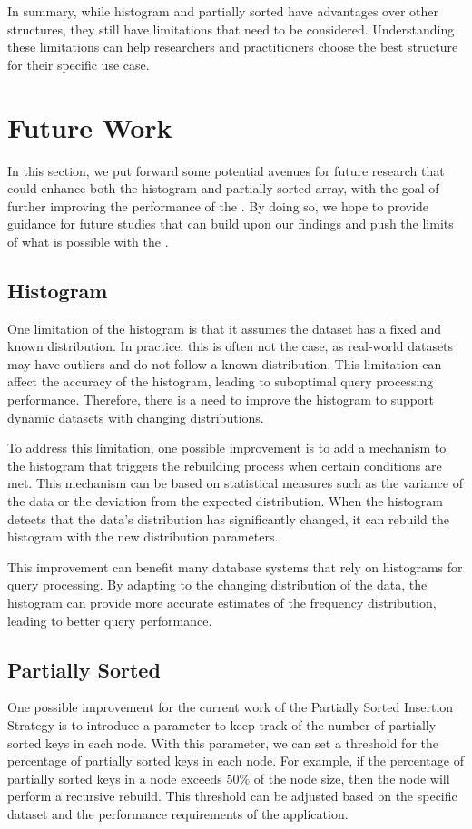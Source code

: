 In summary, while histogram and partially sorted have advantages over other \learnindex structures, they still have limitations that need to be considered. Understanding these limitations can help researchers and practitioners choose the best \learnindex structure for their specific use case.

\section{Future Work}
In this section, we put forward some potential avenues for future research that could enhance both the histogram and partially sorted array, with the goal of further improving the performance of the \learnindex. By doing so, we hope to provide guidance for future studies that can build upon our findings and push the limits of what is possible with the \learnindex.
\subsection{Histogram}
 One limitation of the histogram is that it assumes the dataset has a fixed and known distribution. In practice, this is often not the case, as real-world datasets may have outliers and do not follow a known distribution. This limitation can affect the accuracy of the histogram, leading to suboptimal query processing performance. Therefore, there is a need to improve the histogram to support dynamic datasets with changing distributions.

To address this limitation, one possible improvement is to add a mechanism to the histogram that triggers the rebuilding process when certain conditions are met. This mechanism can be based on statistical measures such as the variance of the data or the deviation from the expected distribution. When the histogram detects that the data's distribution has significantly changed, it can rebuild the histogram with the new distribution parameters.

This improvement can benefit many database systems that rely on histograms for query processing. By adapting to the changing distribution of the data, the histogram can provide more accurate estimates of the frequency distribution, leading to better query performance.


\subsection{Partially Sorted}
One possible improvement for the current work of the Partially Sorted Insertion Strategy is to introduce a parameter to keep track of the number of partially sorted keys in each node. With this parameter, we can set a threshold for the percentage of partially sorted keys in each node. For example, if the percentage of partially sorted keys in a node exceeds $50\%$ of the node size, then the node will perform a recursive rebuild. This threshold can be adjusted based on the specific dataset and the performance requirements of the application.

